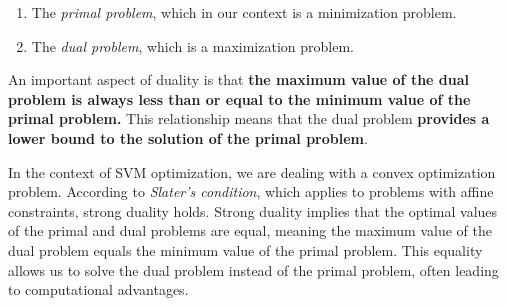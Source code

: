 \begin{enumerate}
	\item The \textit{primal problem}, which in our context is a minimization problem.
	\item The \textit{dual problem}, which is a maximization problem.
\end{enumerate}
An important aspect of duality is that \textbf{the maximum value of the dual problem is always less than or equal to the minimum value of the primal problem.} This relationship means that the dual problem \textbf{provides a lower bound to the solution of the primal problem}.

In the context of SVM optimization, we are dealing with a convex optimization problem. According to \textit{Slater's condition}, which applies to problems with affine constraints, strong duality holds. Strong duality implies that the optimal values of the primal and dual problems are equal, meaning the maximum value of the dual problem equals the minimum value of the primal problem. This equality allows us to solve the dual problem instead of the primal problem, often leading to computational advantages.


